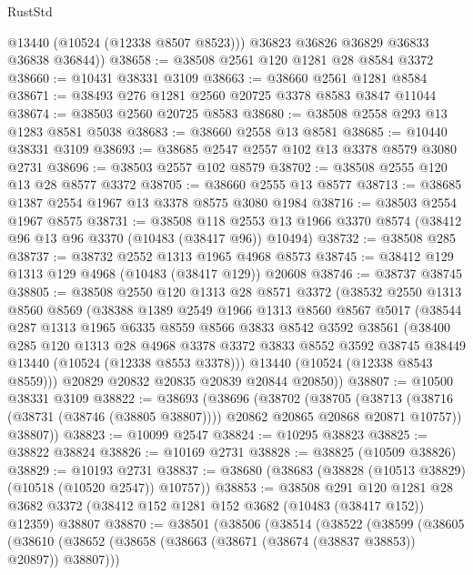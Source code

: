 \begin{lexlean}{RustStd}
\begin{coremodule}
          @13440
          (@10524 (@12338 @8507 @8523)))
        @36823
        @36826
        @36829
        @36833
        @36838
        @36844))
@38658 := @38508 @2561 @120 @1281 @28 @8584 @3372
@38660 := @10431 @38331 @3109
@38663 := @38660 @2561 @1281 @8584
@38671 := @38493 @276 @1281 @2560 @20725 @3378 @8583 @3847 @11044
@38674 := @38503 @2560 @20725 @8583
@38680 := @38508 @2558 @293 @13 @1283 @8581 @5038
@38683 := @38660 @2558 @13 @8581
@38685 := @10440 @38331 @3109
@38693 := @38685 @2547 @2557 @102 @13 @3378 @8579 @3080 @2731
@38696 := @38503 @2557 @102 @8579
@38702 := @38508 @2555 @120 @13 @28 @8577 @3372
@38705 := @38660 @2555 @13 @8577
@38713 := @38685 @1387 @2554 @1967 @13 @3378 @8575 @3080 @1984
@38716 := @38503 @2554 @1967 @8575
@38731 := @38508
    @118
    @2553
    @13
    @1966
    @3370
    @8574
    (@38412 @96 @13 @96 @3370 (@10483 (@38417 @96)) @10494)
@38732 := @38508 @285
@38737 := @38732 @2552 @1313 @1965 @4968 @8573
@38745 := @38412 @129 @1313 @129 @4968 (@10483 (@38417 @129)) @20608
@38746 := @38737 @38745
@38805 := @38508
    @2550
    @120
    @1313
    @28
    @8571
    @3372
    (@38532
      @2550
      @1313
      @8560
      @8569
      (@38388
        @1389
        @2549
        @1966
        @1313
        @8560
        @8567
        @5017
        (@38544
          @287
          @1313
          @1965
          @6335
          @8559
          @8566
          @3833
          @8542
          @3592
          @38561
          (@38400
            @285
            @120
            @1313
            @28
            @4968
            @3378
            @3372
            @3833
            @8552
            @3592
            @38745
            @38449
            @13440
            (@10524 (@12338 @8553 @3378)))
          @13440
          (@10524 (@12338 @8543 @8559)))
        @20829
        @20832
        @20835
        @20839
        @20844
        @20850))
@38807 := @10500 @38331 @3109
@38822 := @38693
    (@38696
      (@38702
        (@38705
          (@38713 (@38716 (@38731 (@38746 (@38805 @38807)))) @20862 @20865 @20868 @20871 @10757))
        @38807))
@38823 := @10099 @2547
@38824 := @10295 @38823
@38825 := @38822 @38824
@38826 := @10169 @2731
@38828 := @38825 (@10509 @38826)
@38829 := @10193 @2731
@38837 := @38680 (@38683 (@38828 (@10513 @38829) (@10518 (@10520 @2547)) @10757))
@38853 := @38508
    @291
    @120
    @1281
    @28
    @3682
    @3372
    (@38412 @152 @1281 @152 @3682 (@10483 (@38417 @152)) @12359)
    @38807
@38870 := @38501
    (@38506
      (@38514
        (@38522
          (@38599
            (@38605
              (@38610 (@38652 (@38658 (@38663 (@38671 (@38674 (@38837 @38853)) @20897)) @38807)))

\end{coremodule}
\end{lexlean}
